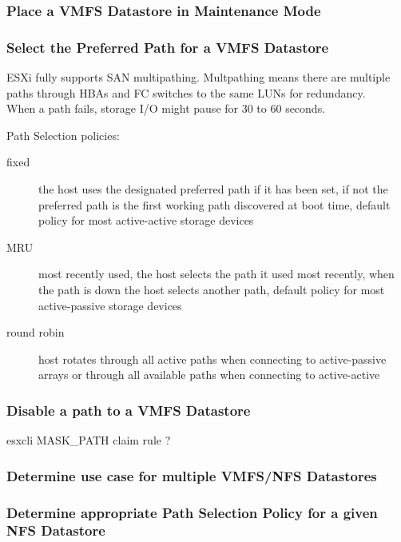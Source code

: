 \subsubsection{Place a VMFS Datastore in Maintenance Mode}

\subsubsection{Select the Preferred Path for a VMFS Datastore}

ESXi fully supports SAN multipathing. Multpathing means there are multiple
paths through HBAs and FC switches to the same LUNs for redundancy.\\

When a path fails, storage I/O might pause for 30 to 60 seconds.

Path Selection policies:

\begin{description}

\item[fixed]
the host uses the designated preferred path if it has been set, if not the
preferred path is the first working path discovered at boot time, default
policy for most active-active storage devices

\item[MRU]
most recently used, the host selects the path it used most recently, when the
path is down the host selects another path, default policy for most
active-passive storage devices

\item[round robin]
host rotates through all active paths when connecting to active-passive arrays
or through all available paths when connecting to active-active

\end{description}
 
\subsubsection{Disable a path to a VMFS Datastore}

esxcli MASK\_PATH claim rule ?
 
\subsubsection{Determine use case for multiple VMFS/NFS Datastores}

\subsubsection{Determine appropriate Path Selection Policy for a given NFS Datastore}
